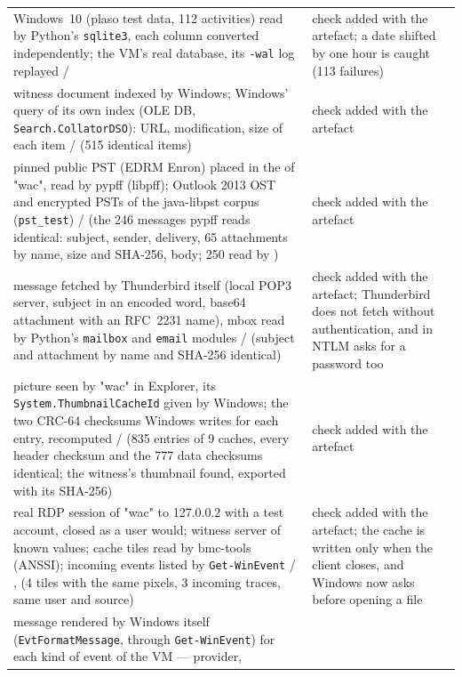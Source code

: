 \documentclass[11pt,a4paper,oneside]{report}
\begin{document}
\begin{longtable}{@{}L{6.6cm}L{8.4cm}@{}}
Windows~10  (plaso test data, 112 activities)
  read by Python's \texttt{sqlite3}, each column converted independently;
  the VM's real database, its \texttt{-wal} log replayed /
   &
  check added with the artefact; a date shifted by one hour is caught
  (113 failures) \\
witness document indexed by Windows; Windows' query of its own index
  (OLE DB, \texttt{Search.CollatorDSO}): URL, modification, size of each
  item /  (515 identical items) &
  check added with the artefact \\
pinned public PST (EDRM Enron) placed in the  of
  "wac", read by pypff (libpff); Outlook 2013 OST and encrypted PSTs of the
  java-libpst corpus (\texttt{pst\_test}) /  (the 246
  messages pypff reads identical: subject, sender, delivery, 65 attachments
  by name, size and SHA-256, body; 250 read by \wac{}) &
  check added with the artefact \\
message fetched by Thunderbird itself (local POP3 server, subject in an
  encoded word, base64 attachment with an RFC~2231 name), mbox read by
  Python's \texttt{mailbox} and \texttt{email} modules / 
  (subject and attachment by name and SHA-256 identical) &
  check added with the artefact; Thunderbird does not fetch without
  authentication, and in NTLM asks for a password too \\
picture seen by "wac" in Explorer, its \texttt{System.ThumbnailCacheId} given
  by Windows; the two CRC-64 checksums Windows writes for each entry,
  recomputed /  (835 entries of 9 caches, every
  header checksum and the 777 data checksums identical; the witness's
  thumbnail found, exported with its SHA-256) &
  check added with the artefact \\
real RDP session of "wac" to 127.0.0.2 with a test account, closed as a user
  would; witness server of known values; cache tiles read by bmc-tools (ANSSI);
  incoming events listed by \texttt{Get-WinEvent} / ,
   (4 tiles with the same pixels, 3 incoming traces,
  same user and source) &
  check added with the artefact; the cache is written only when the client
  closes, and Windows now asks before opening a  file \\
message rendered by Windows itself (\texttt{EvtFormatMessage}, through
  \texttt{Get-WinEvent}) for each kind of event of the VM — provider,

\end{longtable}
\end{document}
